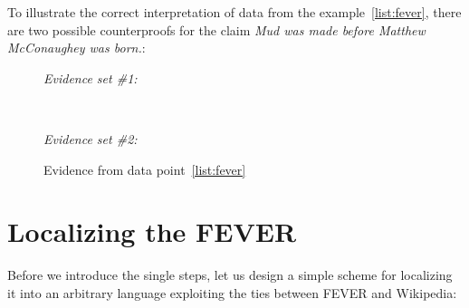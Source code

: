 \noindent To illustrate the correct interpretation of data from the example~\ref{list:fever}, there are two possible counterproofs for the claim \"{\textit{Mud was made before Matthew McConaughey was born.}}:

\begin{figure}[H]
    \centering

    \textit{Evidence set \#1:}
    \begin{ctucolortab}
    
    \end{ctucolortab}

    ~
    
    \textit{Evidence set \#2:}
    
    \begin{ctucolortab}
    \end{ctucolortab}
    \caption{Evidence from data point~\ref{list:fever}}    
    \label{fig:evidence}
\end{figure}

\section{Localizing the FEVER}
\label{sec:fevercs}
Before we introduce the single steps, let us design a simple scheme for localizing it into an arbitrary language exploiting the ties between \textsf{FEVER} and \textsf{Wikipedia}:

